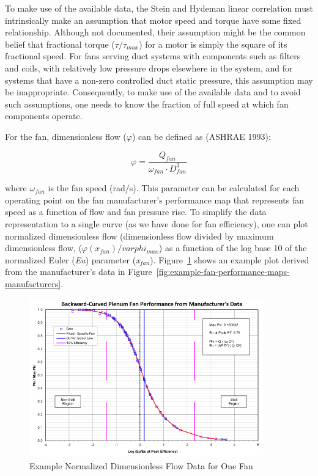 {To make use of the available data, the Stein and Hydeman linear correlation must intrinsically make an assumption that motor speed and torque have some fixed relationship. Although not documented, their assumption might be the common belief that fractional torque (\(\tau / \tau_{max}\)) for a motor is simply the square of its fractional speed. For fans serving duct systems with components such as filters and coils, with relatively low pressure drops elsewhere in the system, and for systems that have a non-zero controlled duct static pressure, this assumption may be inappropriate. Consequently, to make use of the available data and to avoid such assumptions, one needs to know the fraction of full speed at which fan components operate.

For the fan, dimensionless flow (\(\varphi\)) can be defined as (ASHRAE 1993):

\begin{equation}
\varphi = \frac{{{Q_{fan}}}}{{{\omega_{fan}} \cdot D_{fan}^3}} 
\end{equation}

where \(\omega_{fan}\) is the fan speed (rad/s). This parameter can be calculated for each operating point on the fan manufacturer's performance map that represents fan speed as a function of flow and fan pressure rise. To simplify the data representation to a single curve (as we have done for fan efficiency), one can plot normalized dimensionless flow (dimensionless flow divided by maximum dimensionless flow, (\(\varphi({x_{fan}}) / varphi_{max}\)) as a function of the log base 10 of the normalized Euler (\emph{Eu}) parameter (\emph{x\(_{fan}\)}). Figure~\ref{fig:example-normalized-dimensionless-flow-data} shows an example plot derived from the manufacturer's data in Figure~\ref{fig:example-fan-performance-maps-manufacturers}.

\begin{figure}[hbtp] %
\centering
\includegraphics[width=0.9\textwidth, height=0.9\textheight, keepaspectratio=true]{media/image4901.svg.png}
\caption{Example Normalized Dimensionless Flow Data for One Fan \protect \label{fig:example-normalized-dimensionless-flow-data}}
\end{figure}

}
